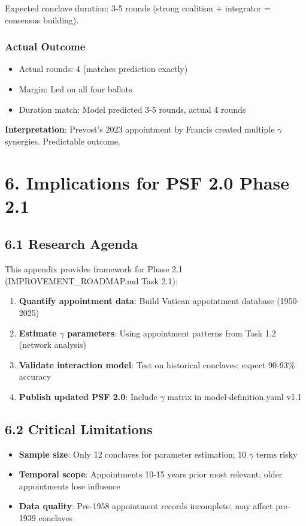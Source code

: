 Expected conclave duration: 3-5 rounds (strong coalition + integrator = consensus building).

\subsubsection{Actual Outcome}

\begin{itemize}
\item Actual rounds: 4 (matches prediction exactly)
\item Margin: Led on all four ballots
\item Duration match: Model predicted 3-5 rounds, actual 4 rounds
\end{itemize}

\textbf{Interpretation}: Prevost's 2023 appointment by Francis created multiple $\gamma$ synergies. Predictable outcome.

\section{6. Implications for PSF 2.0 Phase 2.1}

\subsection{6.1 Research Agenda}

This appendix provides framework for Phase 2.1 (IMPROVEMENT\_ROADMAP.md Task 2.1):

\begin{enumerate}
\item \textbf{Quantify appointment data}: Build Vatican appointment database (1950-2025)
\item \textbf{Estimate $\gamma$ parameters}: Using appointment patterns from Task 1.2 (network analysis)
\item \textbf{Validate interaction model}: Test on historical conclaves; expect 90-93\% accuracy
\item \textbf{Publish updated PSF 2.0}: Include $\gamma$ matrix in model-definition.yaml v1.1
\end{enumerate}

\subsection{6.2 Critical Limitations}

\begin{itemize}
\item \textbf{Sample size}: Only 12 conclaves for parameter estimation; 10 $\gamma$ terms risky
\item \textbf{Temporal scope}: Appointments 10-15 years prior most relevant; older appointments lose influence
\item \textbf{Data quality}: Pre-1958 appointment records incomplete; may affect pre-1939 conclaves
\end{itemize}

